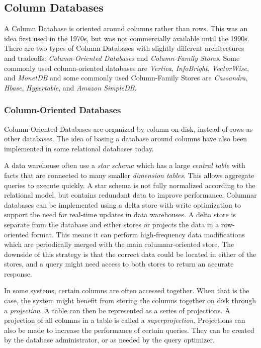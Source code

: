 \subsection{Column Databases}
\label{intro-col-db}

A Column Database is oriented around columns rather than rows. This was an idea first used in the 1970s, but was not commercially available until the 1990s.
There are two types of Column Databases with slightly different architectures and tradeoffs: \emph{Column-Oriented Databases} and \emph{Column-Family Stores}.
Some commonly used column-oriented databases are \emph{Vertica}, \emph{InfoBright}, \emph{VectorWise}, and \emph{MonetDB} and some commonly used Column-Family Stores are \emph{Cassandra}, \emph{Hbase}, \emph{Hypertable}, and \emph{Amazon SimpleDB}.

\subsubsection{Column-Oriented Databases}

Column-Oriented Databases are organized by column on disk, instead of rows as other databases.
The idea of basing a database around columns have also been implemented in some relational databases today.

A data warehouse often use a \emph{star schema} which has a large \emph{central table} with facts that are connected to many smaller \emph{dimension tables}. This allows aggregate queries to execute quickly. A star schema is not fully normalized according to the relational model, but contains redundant data to improve performance.
Columnar databases can be implemented using a delta store with write optimization to support the need for real-time updates in data warehouses. A delta store is separate from the database and either stores or projects the data in a row-oriented format. This means it can perform high-frequency data modifications which are periodically merged with the main columnar-oriented store. The downside of this strategy is that the correct data could be located in either of the stores, and a query might need access to both stores to return an accurate response.

In some systems, certain columns are often accessed together. When that is the case, the system might benefit from storing the columns together on disk through a \emph{projection}. A table can then be represented as a series of projections. A projection of all columns in a table is called a \emph{superprojection}. Projections can also be made to increase the performance of certain queries. They can be created by the database administrator, or as needed by the query optimizer.


